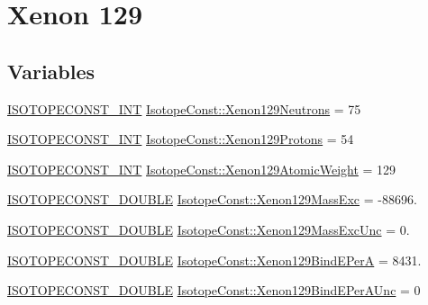 \hypertarget{group___isotope_const-_xenon-_xe129}{}\section{Xenon 129}
\label{group___isotope_const-_xenon-_xe129}
\subsection*{Variables}
\begin{DoxyCompactItemize}
\item 
\mbox{\hyperlink{group___isotope_const-_macros_ga5f18360b3e99483a35c32d789e62621c}{I\+S\+O\+T\+O\+P\+E\+C\+O\+N\+S\+T\+\_\+\+I\+NT}} \mbox{\hyperlink{group___isotope_const-_xenon-_xe129_ga386bbb6f3237b44bdc2279f139f979e8}{Isotope\+Const\+::\+Xenon129\+Neutrons}} = 75
\item 
\mbox{\hyperlink{group___isotope_const-_macros_ga5f18360b3e99483a35c32d789e62621c}{I\+S\+O\+T\+O\+P\+E\+C\+O\+N\+S\+T\+\_\+\+I\+NT}} \mbox{\hyperlink{group___isotope_const-_xenon-_xe129_gadc3c7f7d38d180fde0e87f759120aaee}{Isotope\+Const\+::\+Xenon129\+Protons}} = 54
\item 
\mbox{\hyperlink{group___isotope_const-_macros_ga5f18360b3e99483a35c32d789e62621c}{I\+S\+O\+T\+O\+P\+E\+C\+O\+N\+S\+T\+\_\+\+I\+NT}} \mbox{\hyperlink{group___isotope_const-_xenon-_xe129_ga621e18047763aa7f6eeb7a92522202e1}{Isotope\+Const\+::\+Xenon129\+Atomic\+Weight}} = 129
\item 
\mbox{\hyperlink{group___isotope_const-_macros_ga8f45a7272ce02c0b4c65c44636ed719a}{I\+S\+O\+T\+O\+P\+E\+C\+O\+N\+S\+T\+\_\+\+D\+O\+U\+B\+LE}} \mbox{\hyperlink{group___isotope_const-_xenon-_xe129_gadcef40e365f05a5792a2fea034640b79}{Isotope\+Const\+::\+Xenon129\+Mass\+Exc}} = -\/88696.
\item 
\mbox{\hyperlink{group___isotope_const-_macros_ga8f45a7272ce02c0b4c65c44636ed719a}{I\+S\+O\+T\+O\+P\+E\+C\+O\+N\+S\+T\+\_\+\+D\+O\+U\+B\+LE}} \mbox{\hyperlink{group___isotope_const-_xenon-_xe129_ga997bc13c0dfb62bb73f4f0dcb7526543}{Isotope\+Const\+::\+Xenon129\+Mass\+Exc\+Unc}} = 0.
\item 
\mbox{\hyperlink{group___isotope_const-_macros_ga8f45a7272ce02c0b4c65c44636ed719a}{I\+S\+O\+T\+O\+P\+E\+C\+O\+N\+S\+T\+\_\+\+D\+O\+U\+B\+LE}} \mbox{\hyperlink{group___isotope_const-_xenon-_xe129_gaec1b8de3394fff732d6ec5d66d4aae8f}{Isotope\+Const\+::\+Xenon129\+Bind\+E\+PerA}} = 8431.
\item 
\mbox{\hyperlink{group___isotope_const-_macros_ga8f45a7272ce02c0b4c65c44636ed719a}{I\+S\+O\+T\+O\+P\+E\+C\+O\+N\+S\+T\+\_\+\+D\+O\+U\+B\+LE}} \mbox{\hyperlink{group___isotope_const-_xenon-_xe129_ga6e963e4dbe2892460d93f32442254c46}{Isotope\+Const\+::\+Xenon129\+Bind\+E\+Per\+A\+Unc}} = 0

\end{DoxyCompactItemize}
